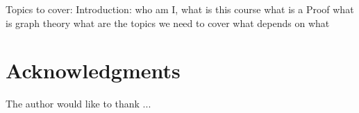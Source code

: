 




Topics to cover:
Introduction: who am I, what is this course
what is a Proof
what is graph theory
what are the topics we need to cover
what depends on what


\section*{Acknowledgments}
The author would like to thank ...
